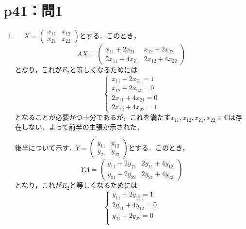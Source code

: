 \documentclass[a4paper,10pt,fleqn]{ltjsarticle}
\begin{document}
\section*{p41：問1}
%

\begin{tleftbar}
    \begin{enumerate}
        \item \mbox{　}
              $ X =\begin{pmatrix} x_{11} & x_{12} \\ x_{21} & x_{22} \end{pmatrix}$とする．このとき，
              \[
                  AX =\begin{pmatrix} x_{11}+2x_{21} &  x_{12}+2x_{22}  \\ 2x_{11} + 4x_{21} &2x_{12} + 4x_{22} \end{pmatrix}
              \]
              となり，これが$E_2$と等しくなるためには
              \[
                  \begin{cases}
                      x_{11}+2x_{21} =1   \\
                      x_{12}+2x_{22}  =0  \\
                      2x_{11} + 4x_{21}=0 \\
                      2x_{12} + 4x_{22}=1
                  \end{cases}
              \]
              となることが必要かつ十分であるが，これを満たす$x_{11},x_{12},x_{21},x_{22} \in \mathbb{C}$は存在しない．よって前半の主張が示された．\par
              後半について示す．$Y =\begin{pmatrix} y_{11} & y_{12} \\ y_{21} & y_{22} \end{pmatrix}$とする．このとき，
              \[
                  YA = \begin{pmatrix} y_{11} +2y_{12} & 2y_{11}+4y_{12} \\ y_{21}+2y_{22} & 2y_{21}+4y_{22}  \end{pmatrix}
              \]
              となり，これが$E_2$と等しくなるためには
              \[
                  \begin{cases}
                      y_{11} +2y_{12}=1   \\
                      2y_{11}+4y_{12}  =0 \\
                      y_{21}+2y_{22} =0   \\

\end{cases}\]
\end{enumerate}
\end{tleftbar}
\end{document}
